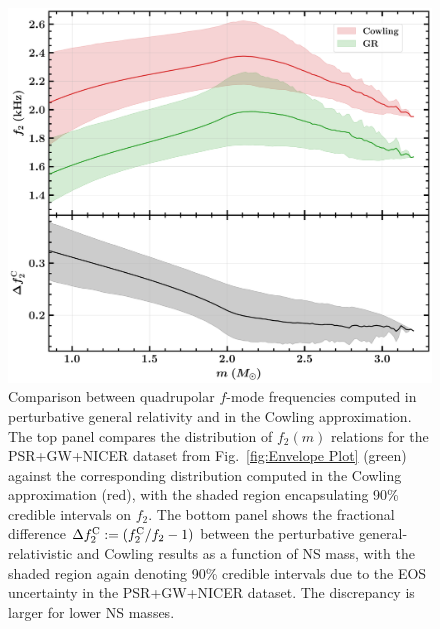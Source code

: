 \documentclass[aps,prd,twocolumn,superscriptaddress,footinbib]{revtex4-1}
\begin{document}
\begin{figure}
    \centering
    \includegraphics[width=\linewidth]{Cowling/CA_vs_GR_Envelope_plot2.pdf}%
    \caption{Comparison between quadrupolar $f$-mode frequencies computed in perturbative general relativity and in the Cowling approximation. The top panel compares the distribution of $f_2(m)$ relations for the PSR+GW+NICER dataset from Fig.~\ref{fig:Envelope Plot} (green) against the corresponding distribution computed in the Cowling approximation (red), with the shaded region encapsulating 90\% credible intervals on $f_2$. The bottom panel shows the fractional difference $\Delta f_2^{\rm C} := (f_2^{\rm C}/f_2 - 1)$ between the perturbative general-relativistic and Cowling results as a function of NS mass, with the shaded region again denoting 90\% credible intervals due to the EOS uncertainty in the PSR+GW+NICER dataset. The discrepancy is larger for lower NS masses.
    }
    \label{fig:cowling1}
\end{figure}
\end{document}

